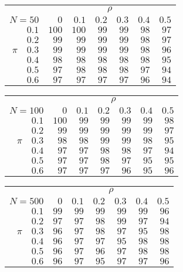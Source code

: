 \begin{tabular}{r|rrrrrr}
\hline\hline
 &\multicolumn{6}{c}{$\rho$} \\ 
 $N = 50$ & $0$ & $0.1$ & $0.2$ & $0.3$ & $0.4$ & $0.5$ \\ 
 \hline$0.1$ & $100$ & $100$ & $99$ & $99$ & $98$ & $97$\\ 
$0.2$ & $99$ & $99$ & $99$ & $99$ & $98$ & $97$\\ 
$\pi\quad$$0.3$ & $99$ & $99$ & $99$ & $99$ & $98$ & $96$\\ 
$0.4$ & $98$ & $98$ & $98$ & $98$ & $98$ & $95$\\ 
$0.5$ & $97$ & $98$ & $98$ & $98$ & $97$ & $94$\\ 
$0.6$ & $97$ & $97$ & $97$ & $97$ & $96$ & $94$\\ 
 \hline 
 \end{tabular}
 
 \vspace{2em} 
 
\begin{tabular}{r|rrrrrr}
\hline\hline
 &\multicolumn{6}{c}{$\rho$} \\ 
 $N = 100$ & $0$ & $0.1$ & $0.2$ & $0.3$ & $0.4$ & $0.5$ \\ 
 \hline$0.1$ & $100$ & $99$ & $99$ & $99$ & $99$ & $98$\\ 
$0.2$ & $99$ & $99$ & $99$ & $99$ & $99$ & $97$\\ 
$\pi\quad$$0.3$ & $98$ & $98$ & $99$ & $99$ & $98$ & $95$\\ 
$0.4$ & $97$ & $97$ & $98$ & $98$ & $97$ & $94$\\ 
$0.5$ & $97$ & $97$ & $98$ & $97$ & $95$ & $95$\\ 
$0.6$ & $97$ & $97$ & $97$ & $96$ & $95$ & $96$\\ 
 \hline 
 \end{tabular}
 
 \vspace{2em} 
 
\begin{tabular}{r|rrrrrr}
\hline\hline
 &\multicolumn{6}{c}{$\rho$} \\ 
 $N = 500$ & $0$ & $0.1$ & $0.2$ & $0.3$ & $0.4$ & $0.5$ \\ 
 \hline$0.1$ & $99$ & $99$ & $99$ & $99$ & $99$ & $96$\\ 
$0.2$ & $97$ & $97$ & $98$ & $99$ & $97$ & $94$\\ 
$\pi\quad$$0.3$ & $96$ & $97$ & $98$ & $97$ & $95$ & $98$\\ 
$0.4$ & $96$ & $97$ & $97$ & $95$ & $98$ & $98$\\ 
$0.5$ & $96$ & $97$ & $96$ & $97$ & $98$ & $98$\\ 
$0.6$ & $96$ & $97$ & $95$ & $97$ & $97$ & $96$\\ 
 \hline 
 \end{tabular}